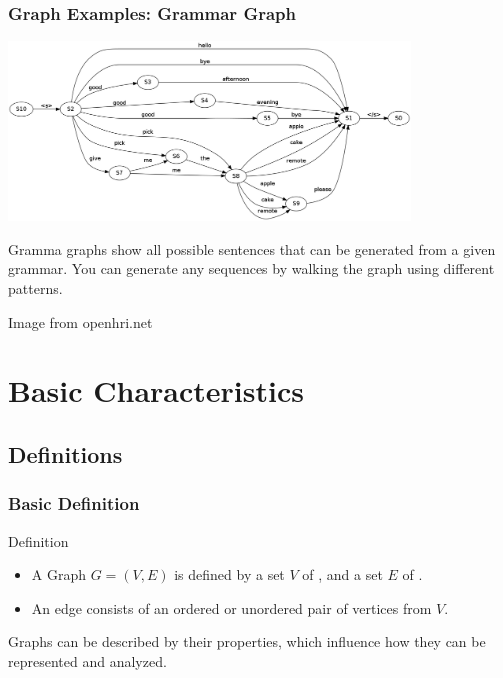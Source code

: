 \documentclass{beamer}
\begin{document}
\begin{frame}
  \frametitle{Graph Examples: Grammar Graph}
  \begin{center}
    \includegraphics[width=0.8\textwidth]{img/grammargraph}
  \end{center}  
  \begin{block}{}
    {\small Gramma graphs show all possible sentences that can be generated
    from a given grammar. You can generate any sequences by walking
    the graph using different patterns.}
  \end{block}
  \hfill\tiny{Image from openhri.net}
\end{frame}



\section{Basic Characteristics}
\subsection{Definitions}

\begin{frame}
  \frametitle{Basic Definition}
  \begin{block}{Definition}
    \begin{itemize}
    \item A Graph $G=(V,E)$ is defined by a set $V$ of
      , and a set $E$ of .
    \item An edge consists of an ordered or unordered pair of vertices
      from $V$.
    \end{itemize}
  \end{block}
  \begin{block}{}
    Graphs can be described by their properties, which influence how
    they can be represented and analyzed.
  \end{block}
\end{frame}
\end{document}
